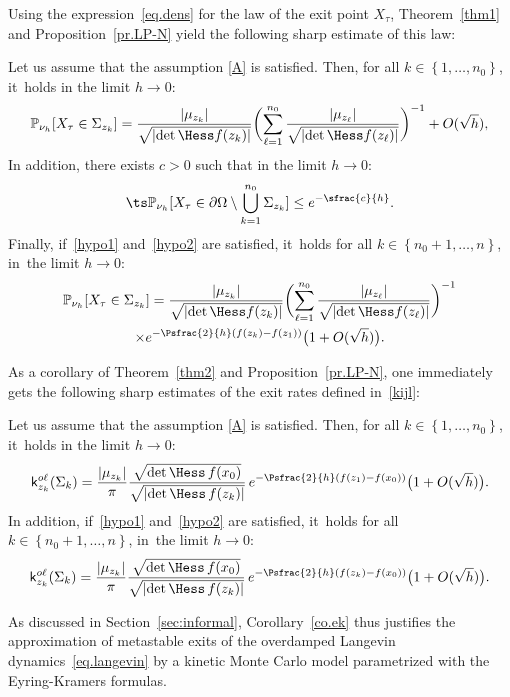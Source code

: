 Using the expression~\eqref{eq.dens} for the law of the exit point $X_\tau$, Theorem~\ref{thm1} and Proposition~\ref{pr.LP-N} yield the following
sharp estimate of this law:
\begin{theorem}\label{thm2}
Let us assume that the assumption \ref{A} is satisfied. Then, for all $k\in \left\{1,\ldots,n_0\right\}$, it~holds in the limit $h\to 0$:
\begin{equation}\label{eq.puh1}
\mathbb P_{\nu_h}[X_{\tau}\in \Sigma_{z_k}]= \frac{ \vert \mu_{z_k}\vert }{\sqrt{\vert {\det \Hess f (z_k)} \vert } }
\biggl (\sum_{\ell=1}^{n_0} \frac{ \vert \mu_{z_\ell}\vert }{\sqrt{\vert {\det \Hess f (z_\ell)} \vert } } \biggr)^{-1} + O({\sqrt h}),
\end{equation}
In addition, there exists $c>0$ such that in the limit $h\to 0$:
\begin{equation}\label{eq.puh2}\ts
\mathbb P_{\nu_h}[X_{\tau}\in \partial \Omega \setminus \bigcup_{k=1}^{n_0}\Sigma_{z_k}]\le e^{-\sfrac{c}{h}}.
\end{equation}
Finally, if~\eqref{hypo1} and~\eqref{hypo2} are satisfied, it~holds for all $k\in \left\{n_0+1,\ldots,n\right\}$, in~the limit $h\to 0$:
\begin{multline}\label{eq.puh3}
\mathbb P_{\nu_h}[X_{\tau}\in \Sigma_{z_k}]=\frac{ \vert \mu_{z_k}\vert }{\sqrt{\vert {\det \Hess f (z_k)} \vert } }
\biggl (\sum_{\ell=1}^{n_0} \frac{ \vert \mu_{z_\ell}\vert }{\sqrt{
\vert {\det \Hess f (z_\ell)} \vert } } \biggr)^{-1} \\
\times e^{-\Psfrac{2}{h}(f(z_k)-f(z_1))}\bigl(1+ O({\sqrt h})
\bigr).
\end{multline}
\end{theorem}

As a corollary of Theorem~\ref{thm2} and Proposition~\ref{pr.LP-N},
one immediately gets the following sharp estimates of the exit rates defined in~\eqref{kijl}:
\begin{corollary}\label{co.ek}
Let us assume that the assumption \ref{A} is satisfied.
Then, for all $k\in \left\{1,\ldots,n_0\right\} $, it~holds in the limit $h\to 0$:
\begin{equation}\label{eq.k*1}
\mathsf k_{z_k}^{o\ell}(\Sigma_k)= \frac{\vert \mu_{z_k}\vert}{\pi }\frac{ \sqrt{{\det\Hess}\, f (x_0) } }{ \sqrt{\vert {\det \Hess}\, f(z_k) \vert } } \,e^{-\Psfrac{2}{h}(f(z_1)-f(x_0))}\bigl(1+ O({\sqrt h}) \bigr).
\end{equation}
In addition, if~\eqref{hypo1} and~\eqref{hypo2} are satisfied, it~holds for all $k\in \left\{n_0+1,\ldots,n\right\}$, in~the limit $h\to 0$:
\begin{equation}\label{eq.k*2}
\mathsf k_{z_k}^{o\ell}(\Sigma_k)= \frac{\vert \mu_{z_k}\vert}{\pi }\frac{ \sqrt{{\det\Hess}\, f (x_0) } }{ \sqrt{\vert {\det \Hess}\, f(z_k) \vert } } \,e^{-\Psfrac{2}{h}(f(z_k)-f(x_0))}\bigl(1+ O({\sqrt h}) \bigr).
\end{equation}
\end{corollary}
As discussed in Section~\ref{sec:informal}, Corollary~\ref{co.ek}
thus justifies the approximation of metastable exits of the overdamped Langevin
dynamics~\eqref{eq.langevin} by a kinetic Monte Carlo model
parametrized with the Eyring-Kramers formulas.

